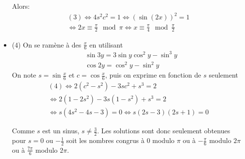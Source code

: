 \begin{itemize}
Alors:
\begin{multline*}
(3) \Leftrightarrow 4s^2c^2 =1 
\Leftrightarrow (\sin(2x))^2 = 1 \\
\Leftrightarrow 2x \equiv \frac{\pi}{2}\mod \pi 
\Leftrightarrow x \equiv \frac{\pi}{4}\mod \frac{\pi}{2}
\end{multline*}

  \item (4) On se ramène à des $\frac{x}{6}$ en utilisant
\begin{align*}
  &\sin 3y = 3\sin y \cos^2y - \sin^3 y \\
  &\cos 2y = \cos^2 y - \sin^2 y
\end{align*}
On note $s=\sin \frac{x}{6}$ et $c=\cos \frac{x}{6}$, puis on exprime en fonction de $s$ seulement
\begin{multline*}
(4)\Leftrightarrow  
2(c^2-s^2)-3sc^2 + s^3 = 2 \\
\Leftrightarrow 2(1-2s^2)-3s(1-s^2) + s^3 = 2 \\
\Leftrightarrow s(4s^2-4s-3)=0
\Leftrightarrow s(2s-3)(2s+1)=0
\end{multline*}

Comme $s$ est un sinus, $s\neq\frac{3}{2}$. Les solutions sont donc seulement obtenues pour $s=0$ ou $-\frac{1}{2}$ soit
les nombres congrus à $0$ modulo $\pi$ ou à $-\frac{\pi}{6}$ modulo $2\pi$ ou à $\frac{7\pi}{6}$ modulo $2\pi$.
\end{itemize}
